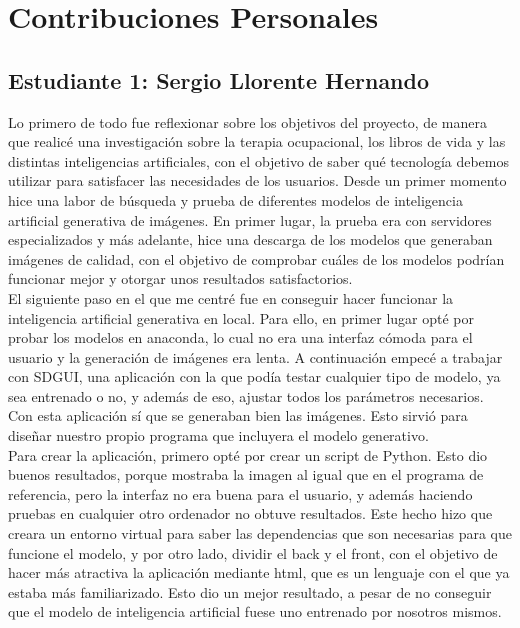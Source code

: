 \chapter*{Contribuciones Personales}
\label{cap:contribucionesPersonales}
\section*{Estudiante 1: Sergio Llorente Hernando}
Lo primero de todo fue reflexionar sobre los objetivos del proyecto, de manera que realicé una investigación sobre la terapia ocupacional, los libros de vida y las distintas inteligencias artificiales, con el objetivo de saber qué tecnología debemos utilizar para satisfacer las necesidades de los usuarios.
Desde un primer momento hice una labor de búsqueda y prueba de diferentes modelos de inteligencia artificial generativa de imágenes. En primer lugar, la prueba era con servidores especializados y más adelante, hice una descarga de los modelos que generaban imágenes de calidad, con el objetivo de comprobar cuáles de los modelos podrían funcionar mejor y otorgar unos resultados satisfactorios.\\

El siguiente paso en el que me centré fue en conseguir hacer funcionar la inteligencia artificial generativa en local. Para ello, en primer lugar opté por probar los modelos en anaconda, lo cual no era una interfaz cómoda para el usuario y la generación de imágenes era lenta. A continuación empecé a trabajar con SDGUI, una aplicación con la que podía testar cualquier tipo de modelo, ya sea entrenado o no, y además de eso, ajustar todos los parámetros necesarios. Con esta aplicación sí que se generaban bien las imágenes. Esto sirvió para diseñar nuestro propio programa que incluyera el modelo generativo. \\

Para crear la aplicación, primero opté por crear un script de Python. Esto dio buenos resultados, porque mostraba la imagen al igual que en el programa de referencia, pero la interfaz no era buena para el usuario, y además haciendo pruebas en cualquier otro ordenador no obtuve resultados. Este hecho hizo que creara un entorno virtual para saber las dependencias que son necesarias para que funcione el modelo, y por otro lado, dividir el back y el front, con el objetivo de hacer más atractiva la aplicación mediante html, que es un lenguaje con el que ya estaba más familiarizado. Esto dio un mejor resultado, a pesar de no conseguir que el modelo de inteligencia artificial fuese uno entrenado por nosotros mismos.\\


